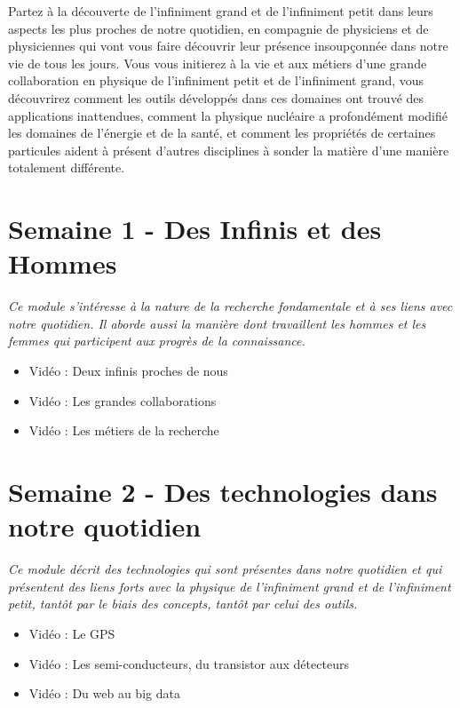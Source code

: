 



Partez à la découverte de l'infiniment grand et de l'infiniment petit dans leurs aspects les plus proches de notre quotidien, en compagnie de physiciens et de physiciennes qui vont vous faire découvrir leur présence insoupçonnée dans notre vie de tous les jours. Vous vous initierez à la vie et aux métiers d'une grande collaboration en physique de l'infiniment petit et de l'infiniment grand, vous découvrirez comment les outils développés dans ces domaines ont trouvé des applications inattendues, comment la physique nucléaire a profondément modifié les domaines de l'énergie et de la santé, et comment les propriétés de certaines particules aident à présent d'autres disciplines à sonder la matière d'une manière totalement différente.

\section*{Semaine 1 - Des Infinis et des Hommes}

\textit{Ce module s'intéresse à la nature de la recherche fondamentale et à ses liens avec notre quotidien. Il aborde aussi la manière dont travaillent les hommes et les femmes qui participent aux progrès de la connaissance.}


\begin{itemize}[label={$\bullet$}]
    \item Vidéo : Deux infinis proches de nous
    \item Vidéo : Les grandes collaborations
    \item Vidéo : Les métiers de la recherche
  \end{itemize}

\section*{Semaine 2 - Des technologies dans notre quotidien}

\textit{Ce module décrit des technologies qui sont présentes dans notre quotidien et qui présentent des liens forts avec la physique de l'infiniment grand et de l'infiniment petit, tantôt par le biais des concepts, tantôt par celui des outils.}
  
  
\begin{itemize}[label={$\bullet$}]
    \item Vidéo : Le GPS
    \item Vidéo : Les semi-conducteurs, du transistor aux détecteurs
    \item Vidéo : Du web au big data
\end{itemize}

